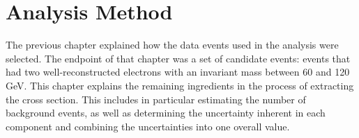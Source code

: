 \newcommand{\nevents}{8453} %

\chapter{Analysis Method}
\label{anMeth}

The previous chapter explained how the data events used 
in the analysis were selected.  
The endpoint of that chapter was a set of 
\Zee candidate events: 
events that had two well-reconstructed electrons 
with an invariant mass between 60 and 120 GeV.  
This chapter explains the remaining ingredients 
in the process of extracting the cross section.  
This includes in particular estimating the number 
of background events, 
as well as determining the uncertainty 
inherent in each component 
and combining the uncertainties into one overall value.  


